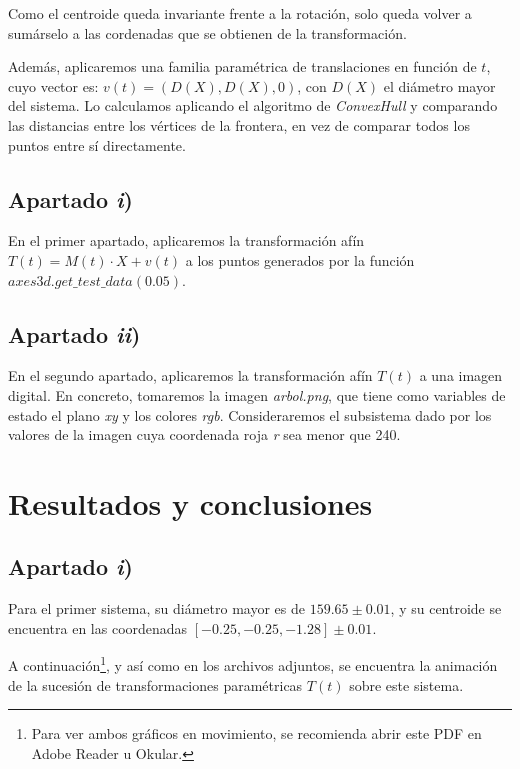 \documentclass[a4paper]{article}
\begin{document}
	Como el centroide queda invariante frente a la rotación, solo queda volver a sumárselo a las cordenadas que se obtienen de la transformación.
	
	Además, aplicaremos una familia paramétrica de translaciones en función de $t$, cuyo vector es: $v(t) = (D(X),D(X),0)$, con $D(X)$ el diámetro mayor del sistema. Lo calculamos aplicando el algoritmo de \textit{ConvexHull} y comparando las distancias entre los vértices de la frontera, en vez de comparar todos los puntos entre sí directamente.
	
	\subsection{Apartado \textit{i})}
	En el primer apartado, aplicaremos la transformación afín $T(t) = M(t) \cdot X + v(t)$ a los puntos generados por la función $axes3d.get\_test\_data(0.05)$.
	
	\subsection{Apartado \textit{ii})}
	En el segundo apartado, aplicaremos la transformación afín $T(t)$ a una imagen digital. En concreto, tomaremos la imagen \textit{arbol.png}, que tiene como variables de estado el plano \textit{xy} y los colores \textit{rgb}. Consideraremos el subsistema dado por los valores de la imagen cuya coordenada roja \textit{r} sea menor que 240.
	
	\section{Resultados y conclusiones}
	
	\subsection{Apartado \textit{i})}
	Para el primer sistema, su diámetro mayor es de $159.65 \pm 0.01$, y su centroide se encuentra en las coordenadas $[-0.25,-0.25,-1.28] \pm 0.01$.
	
	A continuación\footnote{Para ver ambos gráficos en movimiento, se recomienda abrir este PDF en Adobe Reader u Okular.}, y así como en los archivos adjuntos, se encuentra la animación de la sucesión de transformaciones paramétricas $T(t)$ sobre este sistema.
	
	\begin{center}
	\end{center}
	
\end{document}
